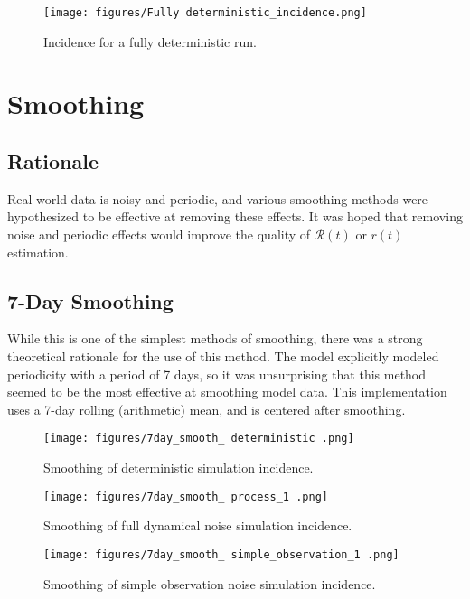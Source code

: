 \documentclass{article}
\newcommand{\nR}{\mathscr{R}}
\begin{document}
\clearpage
\begin{figure}[h!]
    \centering
    \texttt{[image: figures/Fully deterministic\_incidence.png]}
    \caption{Incidence for a fully deterministic run.}
\end{figure}


\section{Smoothing}

\subsection{Rationale}
Real-world data is noisy and periodic, and various smoothing methods were hypothesized to be effective at removing these effects. It was hoped that removing noise and periodic effects would improve the quality of $\nR(t)$ or $r(t)$ estimation.

\subsection{7-Day Smoothing}
While this is one of the simplest methods of smoothing, there was a strong theoretical rationale for the use of this method. The model explicitly modeled periodicity with a period of 7 days, so it was unsurprising that this method seemed to be the most effective at smoothing model data. This implementation uses a 7-day rolling (arithmetic) mean, and is centered after smoothing.

\clearpage
\begin{figure}[h!]
    \centering
    \texttt{[image: figures/7day\_smooth\_ deterministic .png]}
    \caption{Smoothing of deterministic simulation incidence.}
\end{figure}


\clearpage
\begin{figure}[h!]
    \centering
    \texttt{[image: figures/7day\_smooth\_ process\_1 .png]}
    \caption{Smoothing of full dynamical noise simulation incidence.}
\end{figure}

\clearpage
\begin{figure}[h!]
    \centering
    \texttt{[image: figures/7day\_smooth\_ simple\_observation\_1 .png]}
    \caption{Smoothing of simple observation noise simulation incidence.}
\end{figure}
\end{document}
